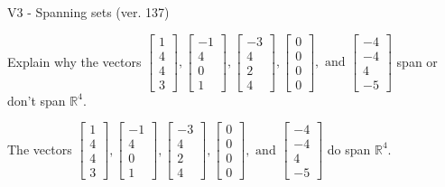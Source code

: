 \begin{exercise}
  \begin{exerciseTitle}V3 - Spanning sets (ver. 137)\end{exerciseTitle}
  \begin{exerciseStatement}
    Explain why the vectors \(\left[\begin{array}{r}
1 \\
4 \\
4 \\
3
\end{array}\right] , \left[\begin{array}{r}
-1 \\
4 \\
0 \\
1
\end{array}\right] , \left[\begin{array}{r}
-3 \\
4 \\
2 \\
4
\end{array}\right] , \left[\begin{array}{r}
0 \\
0 \\
0 \\
0
\end{array}\right] , \text{ and } \left[\begin{array}{r}
-4 \\
-4 \\
4 \\
-5
\end{array}\right]\) span or don't span \(\mathbb{R}^4\). 
	


  \end{exerciseStatement}
  \begin{exerciseAnswer}
   The vectors \(\left[\begin{array}{r}
1 \\
4 \\
4 \\
3
\end{array}\right] , \left[\begin{array}{r}
-1 \\
4 \\
0 \\
1
\end{array}\right] , \left[\begin{array}{r}
-3 \\
4 \\
2 \\
4
\end{array}\right] , \left[\begin{array}{r}
0 \\
0 \\
0 \\
0
\end{array}\right] , \text{ and } \left[\begin{array}{r}
-4 \\
-4 \\
4 \\
-5
\end{array}\right]\) 
  	 do  
	span \(\mathbb{R}^4\).
  


  \end{exerciseAnswer}
\end{exercise}